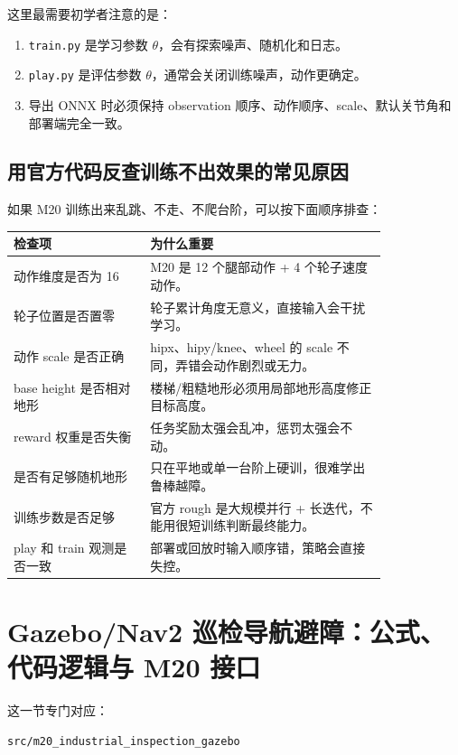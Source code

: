 \documentclass[UTF8,11pt,a4paper]{ctexart}
\begin{document}
这里最需要初学者注意的是：

\begin{enumerate}
  \item \texttt{train.py} 是学习参数 \(\theta\)，会有探索噪声、随机化和日志。
  \item \texttt{play.py} 是评估参数 \(\theta\)，通常会关闭训练噪声，动作更确定。
  \item 导出 ONNX 时必须保持 observation 顺序、动作顺序、scale、默认关节角和部署端完全一致。
\end{enumerate}

\subsection{用官方代码反查训练不出效果的常见原因}

如果 M20 训练出来乱跳、不走、不爬台阶，可以按下面顺序排查：

\begin{center}
\renewcommand{\arraystretch}{1.25}
\begin{tabular}{p{0.30\linewidth}p{0.52\linewidth}}
\toprule
\textbf{检查项} & \textbf{为什么重要}\\
\midrule
动作维度是否为 16 & M20 是 12 个腿部动作 + 4 个轮子速度动作。\\
轮子位置是否置零 & 轮子累计角度无意义，直接输入会干扰学习。\\
动作 scale 是否正确 & hipx、hipy/knee、wheel 的 scale 不同，弄错会动作剧烈或无力。\\
base height 是否相对地形 & 楼梯/粗糙地形必须用局部地形高度修正目标高度。\\
reward 权重是否失衡 & 任务奖励太强会乱冲，惩罚太强会不动。\\
是否有足够随机地形 & 只在平地或单一台阶上硬训，很难学出鲁棒越障。\\
训练步数是否足够 & 官方 rough 是大规模并行 + 长迭代，不能用很短训练判断最终能力。\\
play 和 train 观测是否一致 & 部署或回放时输入顺序错，策略会直接失控。\\
\bottomrule
\end{tabular}
\end{center}

\section{Gazebo/Nav2 巡检导航避障：公式、代码逻辑与 M20 接口}

这一节专门对应：

\begin{verbatim}
src/m20_industrial_inspection_gazebo
\end{verbatim}
\end{document}
